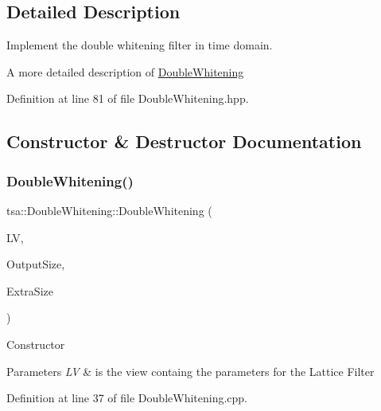 \subsection{Detailed Description}
Implement the double whitening filter in time domain. 

A more detailed description of \hyperlink{classtsa_1_1_double_whitening}{Double\+Whitening} 

Definition at line 81 of file Double\+Whitening.\+hpp.



\subsection{Constructor \& Destructor Documentation}
\mbox{\label{classtsa_1_1_double_whitening_ae3fdd3dfab61182230994059995ad710}} 
\subsubsection{\texorpdfstring{Double\+Whitening()}{DoubleWhitening()}\hspace{0.1cm}{\footnotesize\ttfamily [1/2]}}
{\footnotesize\ttfamily tsa\+::\+Double\+Whitening\+::\+Double\+Whitening (\begin{DoxyParamCaption}\item[{\hyperlink{classtsa_1_1_lattice_view}{Lattice\+View} \&}]{LV,  }\item[{unsigned int}]{Output\+Size,  }\item[{unsigned int}]{Extra\+Size }\end{DoxyParamCaption})}

Constructor 
\begin{DoxyParams}{Parameters}
{\em LV} & is the view containg the parameters for the Lattice Filter \\
\hline
\end{DoxyParams}


Definition at line 37 of file Double\+Whitening.\+cpp.

\mbox{\label{classtsa_1_1_double_whitening_a58092ba19e23ed52e13c8631dd2bd011}} 
